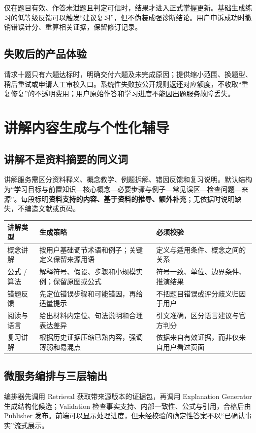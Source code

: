 \documentclass[UTF8,a4paper,11pt,fontset=none]{ctexart}
\newcommand{\cth}[1]{\textbf{\sffamily #1}}
\newcommand{\newsec}[1]{\clearpage\section{#1}}
\newenvironment{tbl}{\par\vspace{3pt}\small\noindent\ignorespaces}{\unskip\par\vspace{5pt}}
\begin{document}
仅在题目有效、作答未泄题且判定可信时，结果才进入正式掌握更新。基础生成练习的低等级反馈可以触发“建议复习”，但不伪装成强诊断结论。用户申诉成功时撤销错误计分、重算相关证据，保留修订记录。

\subsection{失败后的产品体验}
请求十题只有六题达标时，明确交付六题及未完成原因；提供缩小范围、换题型、稍后重试或申请人工审校入口。系统性失败按公开规则返还对应额度，不收取“重复修复”的不透明费用；用户原始作答和学习进度不能因出题服务故障丢失。

\newsec{讲解内容生成与个性化辅导}
\subsection{讲解不是资料摘要的同义词}
讲解服务需区分资料释义、概念教学、例题拆解、错因反馈和复习说明。默认结构为“学习目标与前置知识—核心概念—必要步骤与例子—常见误区—检查问题—来源”。每段标明\textbf{资料支持的内容、基于资料的推导、额外补充}；无依据时说明缺失，不编造文献或页码。

\begin{tbl}
\begin{tabularx}{\linewidth}{@{}L{25mm}YY@{}}
\toprule
\cth{讲解类型}&\cth{生成策略}&\cth{必须校验}\\\midrule
概念讲解&按用户基础调节术语和例子；关键定义保留来源用语&定义与适用条件、概念之间的关系\\
公式 / 算法&解释符号、假设、步骤和小规模实例；保留原图或公式&符号一致、单位、边界条件、推演结果\\
错题反馈&先定位错误步骤和可能错因，再给适量提示&不把题目错误或评分歧义归因于用户\\
阅读与语言&给出材料内定位、句法说明和合理表达差异&引文准确，区分语言建议与官方判分\\
复习讲解&根据历史证据压缩已熟内容，强调薄弱和易混点&依据来自有效证据，而非仅来自用户看过页面\\
\bottomrule
\end{tabularx}
\end{tbl}

\subsection{微服务编排与三层输出}
编排器先调用 Retrieval 获取带来源版本的证据包，再调用 Explanation Generator 生成结构化候选；Validation 检查事实支持、内部一致性、公式与引用，合格后由 Publisher 发布。前端可以显示处理进度，但未经校验的确定性答案不以“已确认事实”流式展示。
\end{document}
